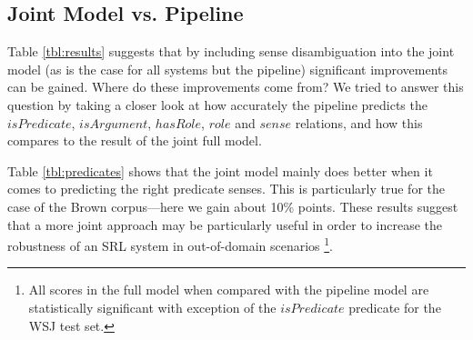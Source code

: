 


\subsection{Joint Model vs. Pipeline}
Table \ref{tbl:results} suggests that by including sense disambiguation into the joint model (as is the case for all systems but the pipeline) significant improvements can be gained. Where do these improvements come from? We tried to answer this question by taking a closer look at how accurately the pipeline predicts the $isPredicate$, $isArgument$, $hasRole$, $role$ and $sense$ relations, and how this compares to the result of the joint full model.

Table \ref{tbl:predicates} shows that the joint model mainly does better when it comes to predicting the right predicate senses. This is particularly true for the case of the Brown corpus---here we gain about 10\% points. These results suggest that a more joint approach may be particularly useful in order to increase the robustness of an SRL system in out-of-domain scenarios \footnote{All scores in the full model when compared with the pipeline model are statistically significant with exception of the $isPredicate$ predicate for the WSJ test set.}.


